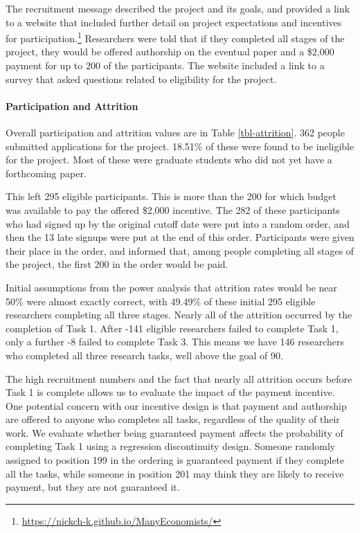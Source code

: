 \documentclass[
  letterpaper,
  DIV=11,
  numbers=noendperiod]{scrartcl}
\let\oldparagraph\paragraph
\renewcommand{\paragraph}[1]{\oldparagraph{#1}\mbox{}}
\begin{document}
The recruitment message described the project and its goals, and
provided a link to a website that included further detail on project
expectations and incentives for participation.\footnote{\url{https://nickch-k.github.io/ManyEconomists/}}
Researchers were told that if they completed all stages of the project,
they would be offered authorship on the eventual paper and a \$2,000
payment for up to 200 of the participants. The website included a link
to a survey that asked questions related to eligibility for the project.

\hypertarget{participation-and-attrition}{%
\paragraph{Participation and
Attrition}\label{participation-and-attrition}}

Overall participation and attrition values are in Table
\ref{tbl-attrition}. 362 people submitted applications for the project.
18.51\% of these were found to be ineligible for the project. Most of
these were graduate students who did not yet have a forthcoming paper.

\hypertarget{tbl-attrition}{}

This left 295 eligible participants. This is more than the 200 for which
budget was available to pay the offered \$2,000 incentive. The 282 of
these participants who had signed up by the original cutoff date were
put into a random order, and then the 13 late signups were put at the
end of this order. Participants were given their place in the order, and
informed that, among people completing all stages of the project, the
first 200 in the order would be paid.

Initial assumptions from the power analysis that attrition rates would
be near 50\% were almost exactly correct, with 49.49\% of these initial
295 eligible researchers completing all three stages. Nearly all of the
attrition occurred by the completion of Task 1. After -141 eligible
researchers failed to complete Task 1, only a further -8 failed to
complete Task 3. This means we have 146 researchers who completed all
three research tasks, well above the goal of 90.

The high recruitment numbers and the fact that nearly all attrition
occurs before Task 1 is complete allows us to evaluate the impact of the
payment incentive. One potential concern with our incentive design is
that payment and authorship are offered to anyone who completes all
tasks, regardless of the quality of their work. We evaluate whether
being guaranteed payment affects the probability of completing Task 1
using a regression discontinuity design. Someone randomly assigned to
position 199 in the ordering is guaranteed payment if they complete all
the tasks, while someone in position 201 may think they are likely to
receive payment, but they are not guaranteed it.
\end{document}
